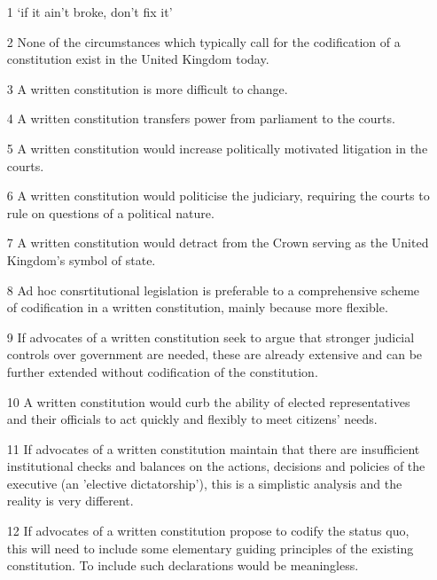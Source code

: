 \documentclass[14pt,titlepage]{extarticle}
\begin{document}
\begin{itemize}
  
\item[1]
 `if it ain't broke, don't fix it'
  
\item[2]
 None of the circumstances which typically call for the codification of a constitution exist in the United Kingdom today.
  
\item[3]
 A written constitution is more difficult to change.
  
\item[4]
 A written constitution transfers power from parliament to the courts.
  
\item[5]
 A written constitution would increase politically motivated litigation in the
 courts.
 
\item[6]
 A written constitution would politicise the judiciary, requiring the courts
 to rule on questions of a political nature.
  
\item[7]
 A written constitution would detract from the Crown serving as the United
Kingdom's symbol of state.
  
\item[8]
 Ad hoc consrtitutional legislation is preferable to a comprehensive scheme of
codification in a written constitution, mainly because more flexible.
  
\item[9]
 If advocates of a written constitution seek to argue that stronger judicial
controls over government are needed, these are already extensive and can be further extended without codification of the constitution.
  
\item[10]
 A written constitution would curb the ability of elected representatives and
their officials to act quickly and flexibly to meet citizens' needs.
  
\item[11]
 If advocates of a written constitution maintain that there are insufficient
institutional checks and balances on the actions, decisions and policies of the
executive (an 'elective dictatorship'), this is a simplistic analysis and the reality is
very different.
  
\item[12]
 If advocates of a written constitution propose to codify the status quo, this
will need to include some elementary guiding principles of the existing constitution.
To include such declarations would be meaningless.
  

\end{itemize}
\end{document}
